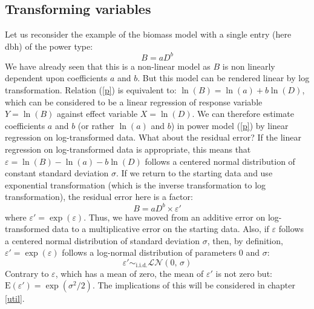 \subsection{Transforming variables\label{trans}}

Let us reconsider the example of the biomass model with a single entry (here dbh) of the power type:
\begin{equation}
B=aD^b\label{p}
\end{equation}
We have already seen that this is a non-linear model as $B$ is non linearly dependent upon coefficients $a$ and $b$. But this model can be rendered linear by log transformation. Relation (\ref{p}) is equivalent to: $\ln(B)=\ln(a)+b\ln(D)$, which can be considered to be a linear regression of response variable $Y=\ln(B)$ against effect variable $X=\ln(D)$. We can therefore estimate coefficients $a$ and $b$ (or rather $\ln(a)$ and $b$) in power model (\ref{p}) by linear regression on log-transformed data. What about the residual error? If the linear regression on log-transformed data is appropriate, this means that $\varepsilon=\ln(B)-\ln(a)-b\ln(D)$ follows a centered normal distribution of constant standard deviation $\sigma$. If we return to the starting data and use exponential transformation (which is the inverse transformation to log transformation), the residual error here is a factor:
\[
B=aD^b\times\varepsilon'
\]
where $\varepsilon'=\exp(\varepsilon)$. Thus, we have moved from an additive error on log-transformed data to a multiplicative error on the starting data. Also, if $\varepsilon$ follows a centered normal distribution of standard deviation $\sigma$, then, by definition, $\varepsilon'=\exp(\varepsilon)$ follows a log-normal distribution of parameters 0 and $\sigma$:
\[
\varepsilon'\mathop{\sim}_{\mathrm{i.i.d.}}\mathcal{LN}(0,\,\sigma)
\]
Contrary to $\varepsilon$, which has a mean of zero, the mean of $\varepsilon'$ is not zero but:
$\mathrm{E}(\varepsilon')=\exp(\sigma^2/2)$. The implications of this will be considered in chapter \ref{util}.

